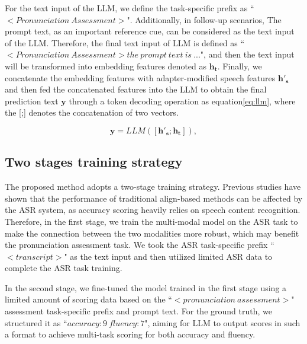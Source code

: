 For the text input of the LLM, we define the task-specific prefix as ``$<Pronunciation~Assessment>$". Additionally, in follow-up scenarios, The prompt text, as an important reference cue, can be considered as the text input of the LLM. Therefore, the final text input of LLM is defined as ``$<Pronunciation~Assessment> the~prompt~text~is~...$", and then the text input will be transformed into embedding features denoted as $\mathbf{{h}_t}$. Finally, we concatenate the embedding features with adapter-modified speech features $\mathbf{{h'}_s}$ and then fed the concatenated features into the LLM to obtain the final prediction text $\mathbf{y}$ through a token decoding operation as equation\eqref{eq:llm}, where the [;] denotes the concatenation of two vectors.


\begin{equation}
\label{eq:llm}
\mathbf{y} =  {LLM}([\mathbf{{h'}_s};\mathbf{h_t}]),
\end{equation}

\subsection{Two stages training  strategy}
The proposed method adopts a two-stage training strategy. Previous studies have shown that the performance of traditional align-based methods can be affected by the ASR system, as accuracy scoring heavily relies on speech content recognition. Therefore, in the first stage, we train the multi-modal model on the ASR task to make the connection between the two modalities more robust, which may benefit the pronunciation assessment task. We took the ASR task-specific prefix ``$<transcript>$" as the text input and then utilized limited ASR data to complete the ASR task training.

In the second stage, we fine-tuned the model trained in the first stage using a limited amount of scoring data based on the ``$<pronunciation~assessment>$" assessment task-specific prefix and prompt text. For the ground truth, we structured it as ``$accuracy:9~fluency:7$", aiming for LLM to output scores in such a format to achieve multi-task scoring for both accuracy and fluency. 
